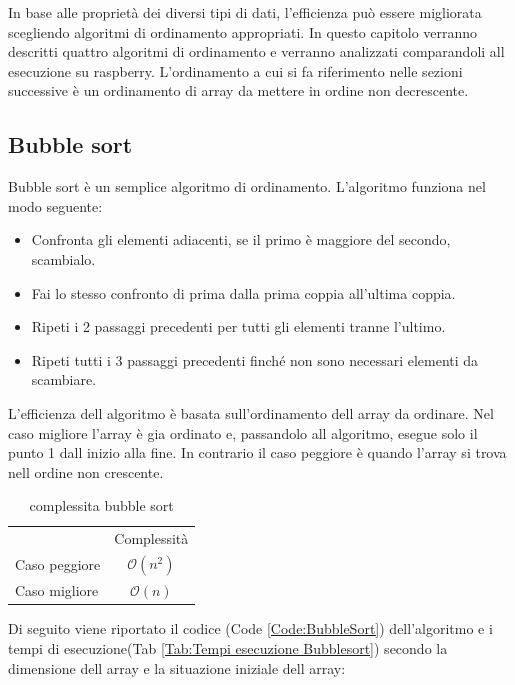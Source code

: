 \documentclass[12pt, a4paper]{report}
\begin{document}
In base alle proprietà dei diversi tipi di dati, l'efficienza può essere migliorata scegliendo algoritmi di ordinamento appropriati. In questo capitolo verranno descritti quattro algoritmi di ordinamento e verranno analizzati comparandoli all esecuzione su raspberry. L'ordinamento a cui si fa riferimento nelle sezioni successive è un ordinamento di array da mettere in ordine non decrescente.

\subsection{Bubble sort}
Bubble sort è un semplice algoritmo di ordinamento. 
L'algoritmo funziona nel modo seguente:
\begin{itemize}
	\item Confronta gli elementi adiacenti, se il primo è maggiore del secondo, scambialo.
	\item Fai lo stesso confronto di prima dalla prima coppia all'ultima coppia. 
	\item Ripeti i 2 passaggi precedenti per tutti gli elementi tranne l'ultimo.
	\item Ripeti tutti i 3 passaggi precedenti finché non sono necessari elementi da scambiare.
\end{itemize}
L'efficienza dell algoritmo è basata sull'ordinamento dell array da ordinare. Nel caso migliore l'array è gia ordinato e, passandolo all algoritmo, esegue solo il punto 1 dall inizio alla fine. In contrario il caso peggiore è quando l'array si trova nell ordine non crescente.
\begin{table}[ht]
	\centering
	\begin{tabular}{lc}
 & Complessità \\
Caso peggiore & $ \mathcal{O}(n^2)$ \\
Caso migliore & $ \mathcal{O}(n)$ \\
\end{tabular}
	\caption{complessita bubble sort}
	\label{Tab:CompBubbleSort}
\end{table}

Di seguito viene riportato il codice (Code \ref{Code:BubbleSort}) dell'algoritmo e i tempi di esecuzione(Tab \ref{Tab:Tempi esecuzione Bubblesort}) secondo la dimensione dell array e la situazione iniziale dell array:
	
\end{document}
